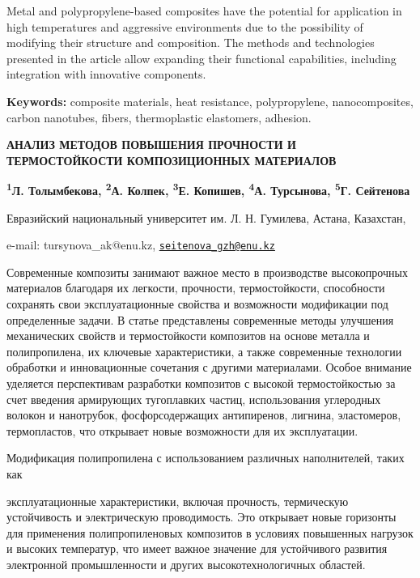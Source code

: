 Metal and polypropylene-based composites have the potential for
application in high temperatures and aggressive environments due to the
possibility of modifying their structure and composition. The methods
and technologies presented in the article allow expanding their
functional capabilities, including integration with innovative
components.

{\bfseries Keywords:} composite materials, heat resistance, polypropylene,
nanocomposites, carbon nanotubes, fibers, thermoplastic elastomers,
adhesion.

\begin{articleheader}
{\bfseries АНАЛИЗ МЕТОДОВ ПОВЫШЕНИЯ ПРОЧНОСТИ И ТЕРМОСТОЙКОСТИ
КОМПОЗИЦИОННЫХ МАТЕРИАЛОВ}

{\bfseries
\textsuperscript{1}Л. Толымбекова,
\textsuperscript{2}А. Колпек,
\textsuperscript{3}Е. Копишев,
\textsuperscript{4}А. Турсынова\textsuperscript{\envelope },
\textsuperscript{5}Г. Сейтенова\textsuperscript{\envelope }
}
\end{articleheader}

\begin{affiliation}
Евразийский национальный университет им. Л. Н. Гумилева, Астана, Казахстан,

e-mail: tursynova\_ak@enu.kz, \href{mailto:seitenova\_gzh@enu.kz}{\nolinkurl{seitenova\_gzh@enu.kz}}
\end{affiliation}

Современные композиты занимают важное место в производстве высокопрочных
материалов благодаря их легкости, прочности, термостойкости, способности
сохранять свои эксплуатационные свойства и возможности модификации под
определенные задачи. В статье представлены современные методы улучшения
механических свойств и термостойкости композитов на основе металла и
полипропилена, их ключевые характеристики, а также современные
технологии обработки и инновационные сочетания с другими материалами.
Особое внимание уделяется перспективам разработки композитов с высокой
термостойкостью за счет введения армирующих тугоплавких частиц,
использования углеродных волокон и нанотрубок, фосфорсодержащих
антипиренов, лигнина, эластомеров, термопластов, что открывает новые
возможности для их эксплуатации.

Модификация полипропилена с использованием различных наполнителей, таких
как

эксплуатационные характеристики, включая прочность, термическую
устойчивость и электрическую проводимость. Это открывает новые горизонты
для применения полипропиленовых композитов в условиях повышенных
нагрузок и высоких температур, что имеет важное значение для устойчивого
развития электронной промышленности и других высокотехнологичных
областей.

